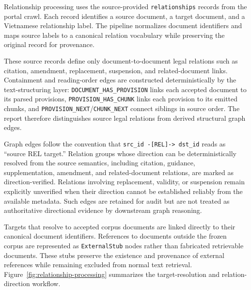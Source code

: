 Relationship processing uses the source-provided \texttt{relationships} records from the portal crawl.
Each record identifies a source document, a target document, and a Vietnamese relationship label.
The pipeline normalizes document identifiers and maps source labels to a canonical relation vocabulary while preserving the original record for provenance.

These source records define only document-to-document legal relations such as citation, amendment, replacement, suspension, and related-document links. Containment and reading-order edges are constructed deterministically by the text-structuring layer: \texttt{DOCUMENT\_HAS\_PROVISION} links each accepted document to its parsed provisions, \texttt{PROVISION\_HAS\_CHUNK} links each provision to its emitted chunks, and \texttt{PROVISION\_NEXT}/\texttt{CHUNK\_NEXT} connect siblings in source order. The report therefore distinguishes source legal relations from derived structural graph edges.

Graph edges follow the convention that
\texttt{src\_id -[REL]-> dst\_id}
reads as ``source REL target.'' Relation groups whose direction can be deterministically resolved from the source semantics, including citation, guidance, supplementation, amendment, and related-document relations, are marked as direction-verified. Relations involving replacement, validity, or suspension remain explicitly unverified when their direction cannot be established reliably from the available metadata. Such edges are retained for audit but are not treated as authoritative directional evidence by downstream graph reasoning.

Targets that resolve to accepted corpus documents are linked directly to their canonical document identifiers.
References to documents outside the frozen corpus are represented as \texttt{ExternalStub} nodes rather than fabricated retrievable documents.
These stubs preserve the existence and provenance of external references while remaining excluded from normal text retrieval.
Figure~\ref{fig:relationship-processing} summarizes the target-resolution and relation-direction workflow.

